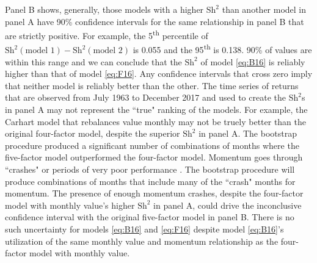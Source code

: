 Panel B shows,
generally, those models with a higher $\text{Sh}^2$ than another model in panel
A have 90\% confidence intervals for the same relationship in panel B that are
strictly positive. For example, the 5\textsuperscript{th} percentile of
$\text{Sh}^2(\text{model 1})-\text{Sh}^2(\text{model 2})$ is 0.055 and the
95\textsuperscript{th} is 0.138. 90\% of values are within this range and we
can conclude that the $\text{Sh}^2$ of model \ref{eq:B16} is reliably higher
than that of model \ref{eq:F16}.
Any confidence intervals that cross zero imply that neither model is reliably
better than the other. The time series of returns that are observed from July
1963 to December 2017 and used to create the $\text{Sh}^2$s in panel A may not
represent the ``true" ranking of the models.
For example, the Carhart model that rebalances value monthly may not be truely
better than the original four-factor model, despite the superior $\text{Sh}^2$
in panel A. The bootstrap procedure produced a significant number of
combinations of months where the five-factor model
outperformed the four-factor model.
Momentum goes through ``crashes" or periods of very poor performance
\parencite{daniel2016momentum, barroso2015momentum}.
The bootstrap procedure will produce combinations of months that include
many of the ``crash" months for momentum.
The presence of enough momentum crashes, despite the four-factor model with
monthly value's higher $\text{Sh}^2$ 
in panel A, could drive the inconclusive confidence interval with the original
five-factor model in panel B.
There is no such uncertainty for models \ref{eq:B16} and \ref{eq:F16} despite
model \ref{eq:B16}'s utilization of the same monthly value and momentum
relationship as the four-factor model with monthly value.

